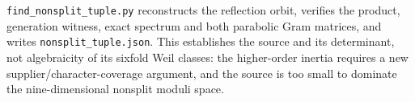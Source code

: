 \texttt{find\_nonsplit\_tuple.py} reconstructs the reflection orbit,
verifies the product, generation witness, exact spectrum and both
parabolic Gram matrices, and writes \texttt{nonsplit\_tuple.json}.
This establishes the source and its determinant, not algebraicity of
its sixfold Weil classes: the higher-order inertia requires a new
supplier/character-coverage argument, and the source is too small to
dominate the nine-dimensional nonsplit moduli space.
